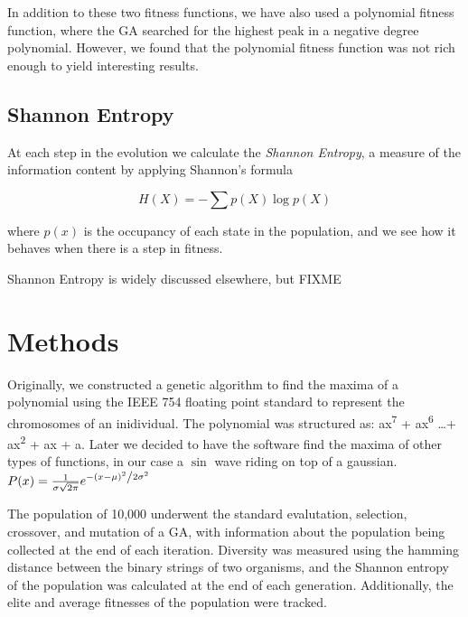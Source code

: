 \documentclass[11pt]{article}
\begin{document}
In addition to these two fitness functions, we have also used a
polynomial fitness function, where the GA searched for the highest
peak in a negative degree polynomial. However, we found that the 
polynomial fitness function was not rich enough to yield interesting results.



\subsection{Shannon Entropy}

At each step in the evolution we calculate the \emph{Shannon Entropy},
a measure of the information content by applying Shannon's formula

$$H(X) = -\sum p(X)\log p(X)$$

where $p(x)$ is the occupancy of each state in the population, and we
see how it behaves when there is a step in fitness.

Shannon Entropy is widely discussed elsewhere, but FIXME




\section{Methods}

Originally, we constructed a genetic algorithm to find the maxima of a
polynomial using the IEEE 754 floating point standard to represent the
chromosomes of an inidividual. The polynomial was structured as: ax\textsuperscript{7}
+ ax\textsuperscript{6} \ldots + ax\textsuperscript{2} + ax + a. Later we
decided to have the software find the maxima of other types of functions,
in our case a $\sin$ wave riding on top of a gaussian. $ P(x) = \frac{1}{{\sigma \sqrt {2\pi } }} e^{{{ - \left( {x - \mu} \right)^2 } \mathord{\left/ {\vphantom {{ - \left( {x - \mu } \right)^2 } {2\sigma ^2 }}} \right. \kern-\nulldelimiterspace} {2\sigma ^2 }}} $

The population of 10,000 underwent the standard evalutation, selection,
crossover, and mutation of a  GA, with information about the population
being collected at the end of each iteration. Diversity was measured using
the hamming distance between the binary strings of two organisms, and the
Shannon entropy of the population was calculated at the end of each generation.
Additionally, the elite and average fitnesses of the population were tracked.
\end{document}

